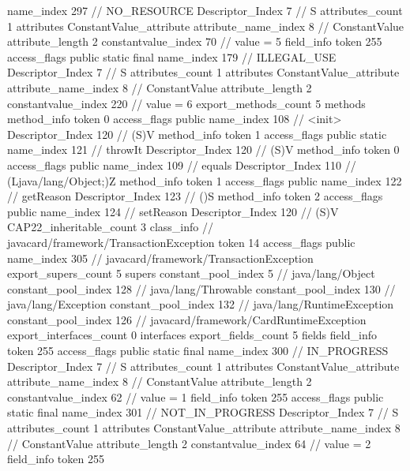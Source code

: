 {{{{{				name_index	297		// NO_RESOURCE
				Descriptor_Index	7		// S
				attributes_count	1
				attributes {
				ConstantValue_attribute {
					attribute_name_index	8		// ConstantValue
					attribute_length	2
					constantvalue_index	70		// value = 5
				}
				}
			}
			field_info {
				token	255
				access_flags	public static final
				name_index	179		// ILLEGAL_USE
				Descriptor_Index	7		// S
				attributes_count	1
				attributes {
				ConstantValue_attribute {
					attribute_name_index	8		// ConstantValue
					attribute_length	2
					constantvalue_index	220		// value = 6
				}
				}
			}
			}
			export_methods_count	5
			methods {
				method_info {
					token	0
					access_flags	public
					name_index	108		// <init>
					Descriptor_Index	120		// (S)V
				}
				method_info {
					token	1
					access_flags	public static
					name_index	121		// throwIt
					Descriptor_Index	120		// (S)V
				}
				method_info {
					token	0
					access_flags	public
					name_index	109		// equals
					Descriptor_Index	110		// (Ljava/lang/Object;)Z
				}
				method_info {
					token	1
					access_flags	public
					name_index	122		// getReason
					Descriptor_Index	123		// ()S
				}
				method_info {
					token	2
					access_flags	public
					name_index	124		// setReason
					Descriptor_Index	120		// (S)V
				}
			}
			CAP22_inheritable_count	3
		}
		class_info {		// javacard/framework/TransactionException
			token	14
			access_flags	public
			name_index	305		// javacard/framework/TransactionException
			export_supers_count	5
			supers {
				constant_pool_index	5		// java/lang/Object
				constant_pool_index	128		// java/lang/Throwable
				constant_pool_index	130		// java/lang/Exception
				constant_pool_index	132		// java/lang/RuntimeException
				constant_pool_index	126		// javacard/framework/CardRuntimeException
			}
			export_interfaces_count	0
			interfaces {
			}
			export_fields_count	5
			fields {
			field_info {
				token	255
				access_flags	public static final
				name_index	300		// IN_PROGRESS
				Descriptor_Index	7		// S
				attributes_count	1
				attributes {
				ConstantValue_attribute {
					attribute_name_index	8		// ConstantValue
					attribute_length	2
					constantvalue_index	62		// value = 1
				}
				}
			}
			field_info {
				token	255
				access_flags	public static final
				name_index	301		// NOT_IN_PROGRESS
				Descriptor_Index	7		// S
				attributes_count	1
				attributes {
				ConstantValue_attribute {
					attribute_name_index	8		// ConstantValue
					attribute_length	2
					constantvalue_index	64		// value = 2
				}
				}
			}
			field_info {
				token	255
}}}}}
